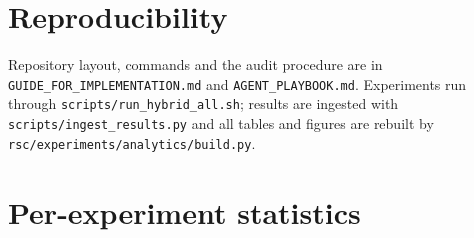 \section{Reproducibility}\label{app:a}
Repository layout, commands and the audit procedure are in \texttt{GUIDE\_FOR\_IMPLEMENTATION.md} and \texttt{AGENT\_PLAYBOOK.md}. Experiments run through \texttt{scripts/run\_hybrid\_all.sh}; results are ingested with \texttt{scripts/ingest\_results.py} and all tables and figures are rebuilt by \texttt{rsc/experiments/analytics/build.py}.
\begin{table}[h]\centering\small{}\caption{Variant $\times$ experiment coverage (number of cases).}\end{table}
\section{Per-experiment statistics}\label{app:b}
\begin{table}[h]\centering\tiny{}\caption{Pairwise win rate, DeFi random (row beats column).}\end{table}
\begin{table}[h]\centering\small{}\caption{Average Friedman ranks, DeFi random.}\end{table}
